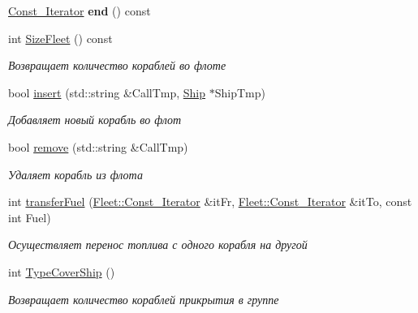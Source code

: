 \begin{DoxyCompactItemize}
\mbox{\hyperlink{class_aircraft_carrier_group_1_1_const_fleet_it}{Const\+\_\+\+Iterator}} {\bfseries end} () const
\item 
\mbox{\label{class_aircraft_carrier_group_1_1_fleet_a410acdddcd290d3c0760b895cd1210f7}} 
int \mbox{\hyperlink{class_aircraft_carrier_group_1_1_fleet_a410acdddcd290d3c0760b895cd1210f7}{Size\+Fleet}} () const
\begin{DoxyCompactList}\small\item\em Возвращает количество кораблей во флоте \end{DoxyCompactList}\item 
bool \mbox{\hyperlink{class_aircraft_carrier_group_1_1_fleet_ac2f313e4be33de186169699fe37163ab}{insert}} (std\+::string \&Call\+Tmp, \mbox{\hyperlink{class_aircraft_carrier_group_1_1_ship}{Ship}} $\ast$Ship\+Tmp)
\begin{DoxyCompactList}\small\item\em Добавляет новый корабль во флот \end{DoxyCompactList}\item 
bool \mbox{\hyperlink{class_aircraft_carrier_group_1_1_fleet_a7fa09607af647d0fb7edce10b90d28a3}{remove}} (std\+::string \&Call\+Tmp)
\begin{DoxyCompactList}\small\item\em Удаляет корабль из флота \end{DoxyCompactList}\item 
int \mbox{\hyperlink{class_aircraft_carrier_group_1_1_fleet_af9ddb1220e3a01986eaa433e52fa7098}{transfer\+Fuel}} (\mbox{\hyperlink{class_aircraft_carrier_group_1_1_const_fleet_it}{Fleet\+::\+Const\+\_\+\+Iterator}} \&it\+Fr, \mbox{\hyperlink{class_aircraft_carrier_group_1_1_const_fleet_it}{Fleet\+::\+Const\+\_\+\+Iterator}} \&it\+To, const int Fuel)
\begin{DoxyCompactList}\small\item\em Осуществляет перенос топлива с одного корабля на другой \end{DoxyCompactList}\item 
\mbox{\label{class_aircraft_carrier_group_1_1_fleet_a3dc50b9a6145d8433c3d902f7dddf739}} 
int \mbox{\hyperlink{class_aircraft_carrier_group_1_1_fleet_a3dc50b9a6145d8433c3d902f7dddf739}{Type\+Cover\+Ship}} ()
\begin{DoxyCompactList}\small\item\em Возвращает количество кораблей прикрытия в группе \end{DoxyCompactList}\item 

\end{DoxyCompactItemize}
